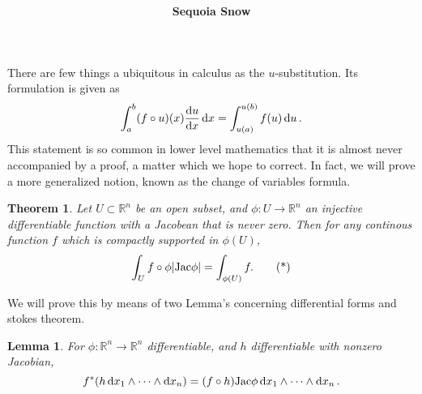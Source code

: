 \documentclass[10pt, oneside]{extarticle}
\title{
\textmd{\textbf{\articletile}}\\
}
\author{\textbf{Sequoia Snow}}
\date{}
\newtheorem*{theorem}{Theorem}
\newtheorem*{lemma}{Lemma}
\renewcommand{\to}[0]{\longrightarrow}
\newcommand{\jac}[0]{{\text{Jac}}}
\newcommand{\R}{{\mathbb{R}}}
\begin{document}
\maketitle

There are few things a ubiquitous in calculus as the $u$-substitution. Its formulation is given as 
\[
  \int_{a}^{b} (f \circ u)(x) \dv{u}{x}  \dd{x} = \int_{u(a)}^{u(b)} f(u) \dd{u}.
\]
This statement is so common in lower level mathematics that it is almost never accompanied by a proof, a matter which we hope to correct. In fact, we will prove a more generalized notion, known as the change of variables formula. 

\begin{theorem}
  Let $U \subset \R^n$ be an open subset, and $\phi : U \to \R^n$ an injective differentiable function with a Jacobean that is never zero. Then for any continous function $f$ which is compactly supported in $\phi(U)$, 
  \[
    \int_{U} f \circ \phi \abs{\jac\phi} = \int_{\phi(U)} f .  \label{eq:cov} \tag{*}
  \] 
\end{theorem}

We will prove this by means of two Lemma's concerning differential forms and stokes theorem. 

\begin{lemma}
  For $\phi : \R^n \to \R^n$ differentiable, and $h$ differentiable with nonzero Jacobian,
  \[
    f^*(h \dd{x_1} \wedge \dots \wedge \dd{x_n}) = \qty(f \circ h) {\jac \phi} \dd{x_1} \wedge \dots \wedge \dd{x_n}.
  \] 
\end{lemma}
\end{document}
